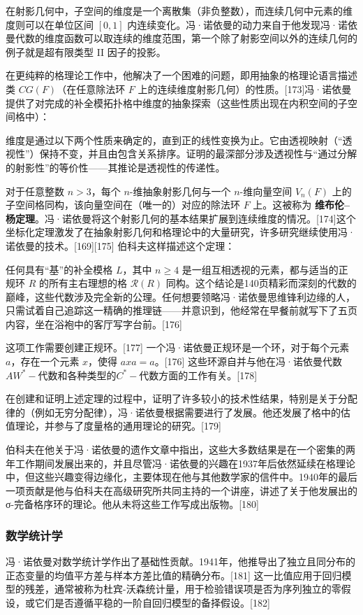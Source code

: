 在射影几何中，子空间的维度是一个离散集（非负整数），而连续几何中元素的维度则可以在单位区间 \([0, 1]\) 内连续变化。冯·诺依曼的动力来自于他发现冯·诺依曼代数的维度函数可以取连续的维度范围，第一个除了射影空间以外的连续几何的例子就是超有限类型 II 因子的投影。

在更纯粹的格理论工作中，他解决了一个困难的问题，即用抽象的格理论语言描述类 \( \mathit{CG(F)} \)（在任意除法环 \( \mathit{F} \) 上的连续维度射影几何）的性质。[173]冯·诺依曼提供了对完成的补全模拓扑格中维度的抽象探索（这些性质出现在内积空间的子空间格中）：

维度是通过以下两个性质来确定的，直到正的线性变换为止。它由透视映射（“透视性”）保持不变，并且由包含关系排序。证明的最深部分涉及透视性与“通过分解的射影性”的等价性——其推论是透视性的传递性。

对于任意整数 \( n > 3 \)，每个 \( n \)-维抽象射影几何与一个 \( n \)-维向量空间 \( V_{n}(F) \) 上的子空间格同构，该向量空间在（唯一的）对应的除法环 \( F \) 上。这被称为 \textbf{维布伦–杨定理}。冯·诺依曼将这个射影几何的基本结果扩展到连续维度的情况。[174]这个坐标化定理激发了在抽象射影几何和格理论中的大量研究，许多研究继续使用冯·诺依曼的技术。[169][175] 伯科夫这样描述这个定理：

任何具有“基”的补全模格 \( L \)，其中 \( n \geq 4 \) 是一组互相透视的元素，都与适当的正规环 \( R \) 的所有主右理想的格 \( \mathcal{R}(R) \) 同构。这个结论是140页精彩而深刻的代数的巅峰，这些代数涉及完全新的公理。任何想要领略冯·诺依曼思维锋利边缘的人，只需试着自己追踪这一精确的推理链——并意识到，他经常在早餐前就写下了五页内容，坐在浴袍中的客厅写字台前。[176]

这项工作需要创建正规环。[177] 一个冯·诺依曼正规环是一个环，对于每个元素 \( a \)，存在一个元素 \( x \)，使得 \( axa = a \)。[176] 这些环源自并与他在冯·诺依曼代数\(AW^*-\)代数和各种类型的\(C^*-\)代数方面的工作有关。[178]

在创建和证明上述定理的过程中，证明了许多较小的技术性结果，特别是关于分配律的（例如无穷分配律），冯·诺依曼根据需要进行了发展。他还发展了格中的估值理论，并参与了度量格的通用理论的研究。[179]

伯科夫在他关于冯·诺依曼的遗作文章中指出，这些大多数结果是在一个密集的两年工作期间发展出来的，并且尽管冯·诺依曼的兴趣在1937年后依然延续在格理论中，但这些兴趣变得边缘化，主要体现在他与其他数学家的信件中。1940年的最后一项贡献是他与伯科夫在高级研究所共同主持的一个讲座，讲述了关于他发展出的σ-完备格序环的理论。他从未将这些工作写成出版物。[180]
\subsubsection{数学统计学}  
冯·诺依曼对数学统计学作出了基础性贡献。1941年，他推导出了独立且同分布的正态变量的均值平方差与样本方差比值的精确分布。[181] 这一比值应用于回归模型的残差，通常被称为杜宾-沃森统计量，用于检验错误项是否为序列独立的零假设，或它们是否遵循平稳的一阶自回归模型的备择假设。[182]


